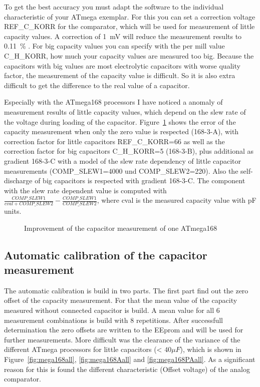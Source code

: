 To get the best accuracy you must adapt the software to the individual characteristic of your ATmega exemplar.
For this you can set a correction voltage REF\_C\_KORR for the comparator, which will be used for measurement of little capacity values.
A correction of 1~mV will reduce the measurement results to 0.11~\% .
For big capacity values you can specify with the per mill value C\_H\_KORR, how much your capacity values are measured too big.
Because the capacitors with big values are most electrolytic capacitors with worse quality factor, the measurement of
the capacity value is difficult. So it is also extra difficult to get the difference to the real value of a capacitor.

Especially with the ATmega168 processors I have noticed a anomaly of measurement results of little capacity values,
which depend on the slew rate of the voltage during loading of the capacitor.
Figure~\ref{fig:mega168optcap} shows the error of the capacity measurement when only the zero value is respected
(168-3-A), with correction factor for little capacitors REF\_C\_KORR=66 as well as the correction factor for big
capacitors C\_H\_KORR=5 (168-3-B), plus additional as gradient 168-3-C  with a model of the slew rate dependency of little capacitor 
measurements (COMP\_SLEW1=4000 und COMP\_SLEW2=220). Also the self-discharge of big capacitors is respected with gradient 168-3-C.
The component with the slew rate dependent value is computed with \(\frac{COMP\_SLEW1}{cval+COMP\_SLEW2} - \frac{COMP\_SLEW1}{COMP\_SLEW2}\),
where cval is the measured capacity value with pF units.

\begin{figure}[H]
\centering

\caption{Improvement of the capacitor measurement of one ATmega168}
\label{fig:mega168optcap}
\end{figure}

\subsection{Automatic calibration of the capacitor measurement}

The automatic calibration is build in two parts. The first part find out the zero offset of the capacity measurement.
For that the mean value of the capacity measured without connected capacitor is build. 
A mean value for all 6 measurement combinations is build with 8 repetitions.
After successfull determination the zero offsets are written to the EEprom and will be used for further measurements.
More difficult was the clearance of the variance of the different ATmega processors for little capacitors (< \(40 \mu F\)),
which is shown in Figure~\ref{fig:mega168all}, \ref{fig:mega168Aall} and \ref{fig:mega168PAall}.
As a significant reason for this is found the different characteristic (Offset voltage) of the analog comparator.

